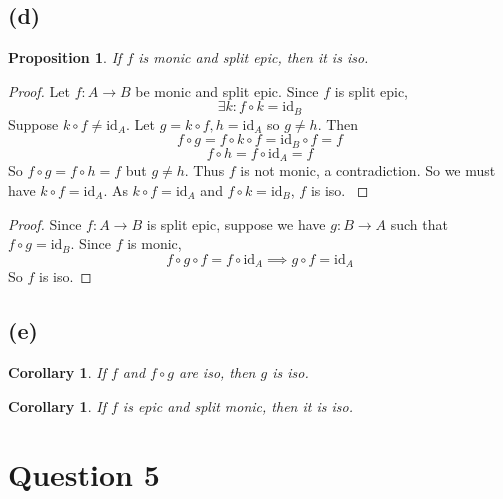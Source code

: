 \documentclass[11pt]{article} %
\newtheorem{corollary}[theorem]{Corollary}
\newtheorem{proposition}[theorem]{Proposition}
\theoremstyle{definition}
\begin{document}
\subsection*{(d)}
\begin{proposition}
    If $f$ is monic and split epic, then it is iso.
\end{proposition}
\begin{proof}
    Let $f:A\rightarrow B$ be monic and split epic. Since $f$ is split epic,
    \[\exists k: f\circ k = \text{id}_B\]
{\color{red}
    Suppose $k\circ f\neq \text{id}_A$.
    Let $g=k\circ f,h=\text{id}_A$ so $g\neq h$. Then
    \[f\circ g = f\circ k\circ f = \text{id}_B \circ f = f\]
    \[f\circ h = f\circ \text{id}_A = f\]
    So $f\circ g = f\circ h = f$ but $g \neq h$.
    Thus $f$ is not monic, a contradiction.
    So we must have $k\circ f= \text{id}_A$.
    As $k\circ f= \text{id}_A$ and $f\circ k = \text{id}_B$, $f$ is iso.
}
\end{proof}
{\color{teal}
\begin{proof}
    Since $f:A\rightarrow B$ is split epic, suppose we have $g:B\rightarrow A$ such that $f\circ g=\text{id}_B$.
    Since $f$ is monic,
    \[f\circ g\circ f = f\circ \text{id}_A\implies g\circ f = \text{id}_A\]
    So $f$ is iso.
\end{proof}
}
\subsection*{(e)}
\begin{corollary}
    If $f$ and $f\circ g$ are iso, then $g$ is iso.
\end{corollary}
\begin{corollary}
    If $f$ is epic and split monic, then it is iso.
\end{corollary}

\section*{Question 5}
\addtocounter{section}{1}
\end{document}
